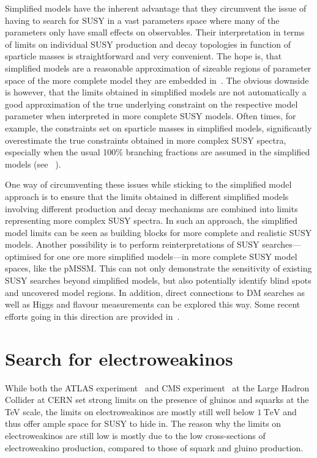 Simplified models have the inherent advantage that they circumvent the issue of having to search for SUSY in a vast parameters space where many of the parameters only have small effects on observables. Their interpretation in terms of limits on individual SUSY production and decay topologies in function of sparticle masses is straightforward and very convenient. The hope is, that simplified models are a reasonable approximation of sizeable regions of parameter space of the more complete model they are embedded in~\cite{pdg2020}. The obvious downside is however, that the limits obtained in simplified models are not automatically a good approximation of the true underlying constraint on the respective model parameter when interpreted in more complete SUSY models. Often times, for example, the constraints set on sparticle masses in simplified models, significantly overestimate the true constraints obtained in more complex SUSY spectra, especially when the usual 100\% branching fractions are assumed in the simplified models (see \eg~\cite{Ambrogi:2017lov,Buchmueller:2013exa}).

One way of circumventing these issues while sticking to the simplified model approach is to ensure that the limits obtained in different simplified models involving different production and decay mechanisms are combined into limits representing more complex SUSY spectra. In such an approach, the simplified model limits can be seen as building blocks for more complete and realistic SUSY models. Another possibility is to perform reinterpretations of SUSY searches---optimised for one ore more simplified models---in more complete SUSY model spaces, like \eg the pMSSM. This can not only demonstrate the sensitivity of existing SUSY searches beyond simplified models, but also potentially identify blind spots and uncovered model regions. In addition, direct connections to DM searches as well as Higgs and flavour measurements can be explored this way. Some recent efforts going in this direction are provided in~\cite{Ambrogi:2017lov, Aaboud:2016wna, pMSSM-scan-run1:2015baa}.


\section{Search for electroweakinos}

While both the ATLAS experiment~\cite{ATLASsummary} and CMS experiment~\cite{CMSsummary} at the Large Hadron Collider at CERN set strong limits on the presence of gluinos and squarks at the TeV scale, the limits on electroweakinos are mostly still well below $\SI{1}{\TeV}$ and thus offer ample space for SUSY to hide in. The reason why the limits on electroweakinos are still low is mostly due to the low cross-sections of electroweakino production, compared to those of squark and gluino production. 

